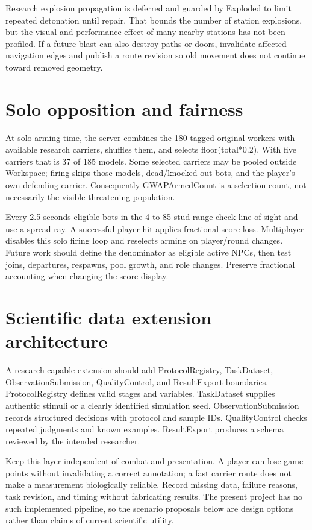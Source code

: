 Research explosion propagation is deferred and guarded by Exploded to limit repeated detonation until repair.\allowbreak{} That bounds the number of station explosions, but the visual and performance effect of many nearby stations has not been profiled.\allowbreak{} If a future blast can also destroy paths or doors, invalidate affected navigation edges and publish a route revision so old movement does not continue toward removed geometry.\allowbreak{}

\section{Solo opposition and fairness}
At solo arming time, the server combines the 180 tagged original workers with available research carriers, shuffles them, and selects floor(total*0.\allowbreak{}2).\allowbreak{} With five carriers that is 37 of 185 models.\allowbreak{} Some selected carriers may be pooled outside Workspace; firing skips those models, dead/\allowbreak{}knocked-out bots, and the player's own defending carrier.\allowbreak{} Consequently GWAPArmedCount is a selection count, not necessarily the visible threatening population.\allowbreak{}

Every 2.\allowbreak{}5 seconds eligible bots in the 4-to-85-stud range check line of sight and use a spread ray.\allowbreak{} A successful player hit applies fractional score loss.\allowbreak{} Multiplayer disables this solo firing loop and reselects arming on player/\allowbreak{}round changes.\allowbreak{} Future work should define the denominator as eligible active NPCs, then test joins, departures, respawns, pool growth, and role changes.\allowbreak{} Preserve fractional accounting when changing the score display.\allowbreak{}

\section{Scientific data extension architecture}
A research-capable extension should add ProtocolRegistry, TaskDataset, ObservationSubmission, QualityControl, and ResultExport boundaries.\allowbreak{} ProtocolRegistry defines valid stages and variables.\allowbreak{} TaskDataset supplies authentic stimuli or a clearly identified simulation seed.\allowbreak{} ObservationSubmission records structured decisions with protocol and sample IDs.\allowbreak{} QualityControl checks repeated judgments and known examples.\allowbreak{} ResultExport produces a schema reviewed by the intended researcher.\allowbreak{}

Keep this layer independent of combat and presentation.\allowbreak{} A player can lose game points without invalidating a correct annotation; a fast carrier route does not make a measurement biologically reliable.\allowbreak{} Record missing data, failure reasons, task revision, and timing without fabricating results.\allowbreak{} The present project has no such implemented pipeline, so the scenario proposals below are design options rather than claims of current scientific utility.\allowbreak{}
